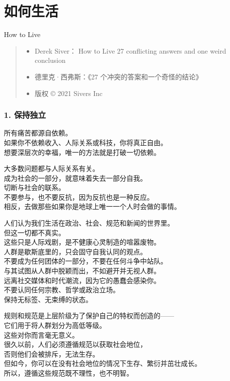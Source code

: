 \documentclass[
]{article}
\author{}
\date{}
\begin{document}
\section{如何生活}\label{ux5982ux4f55ux751fux6d3b}

How to Live

\begin{quote}
\begin{itemize}
\item
  Derek Siver： How to Live 27 conflicting answers and one weird
  conclusion
\item
  德里克·西弗斯：《27 个冲突的答案和一个奇怪的结论》
\item
  版权 © 2021 Sivers Inc
\end{itemize}
\end{quote}

\subsubsection{1. 保持独立}\label{1-ux4fddux6301ux72ecux7acb}

所有痛苦都源自依赖。\\
如果你不依赖收入、人际关系或科技，你将真正自由。\\
想要深层次的幸福，唯一的方法就是打破一切依赖。

大多数问题都与人际关系有关。\\
成为社会的一部分，就意味着失去一部分自我。\\
切断与社会的联系。\\
不要参与，也不要反抗，因为反抗也是一种反应。\\
相反，去做那些如果你是地球上唯一一个人时会做的事情。

人们认为我们生活在政治、社会、规范和新闻的世界里。\\
但这一切都不真实。\\
这些只是人际戏剧，是不健康心灵制造的喧嚣废物。\\
人群是歇斯底里的，只会固守自我认同的观点。\\
不要成为任何团体的一部分，不要在任何斗争中站队。\\
与其试图从人群中脱颖而出，不如避开并无视人群。\\
远离社交媒体和时代潮流，因为它的愚蠢会感染你。\\
不要认同任何宗教、哲学或政治立场。\\
保持无标签、无束缚的状态。

规则和规范是上层阶级为了保护自己的特权而创造的------\\
它们用于将人群划分为高低等级。\\
这些对你而言毫无意义。\\
很久以前，人们必须遵循规范以获取社会地位，\\
否则他们会被排斥，无法生存。\\
但如今，你可以在没有社会地位的情况下生存、繁衍并茁壮成长。\\
所以，遵循这些规范既不理性，也不明智。
\end{document}
